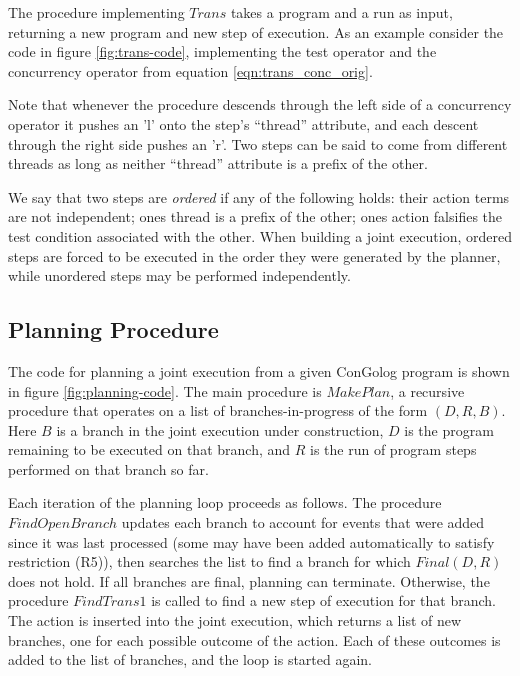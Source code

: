 The procedure implementing $Trans$ takes a program and a run as input,
returning a new program and new step of execution. As an example consider
the code in figure \ref{fig:trans-code}, implementing the test operator
and the concurrency operator from equation \ref{eqn:trans_conc_orig}.


Note that whenever the procedure descends through the left side of
a concurrency operator it pushes an 'l' onto the step's {}``thread''
attribute, and each descent through the right side pushes an 'r'.
Two steps can be said to come from different threads as long as neither
{}``thread'' attribute is a prefix of the other.

We say that two steps are \emph{ordered} if any of the following holds:
their action terms are not independent; ones thread is a prefix of
the other; ones action falsifies the test condition associated with
the other. When building a joint execution, ordered steps are forced
to be executed in the order they were generated by the planner, while
unordered steps may be performed independently.


\subsection{Planning Procedure}

The code for planning a joint execution from a given ConGolog program
is shown in figure \ref{fig:planning-code}. The main procedure is
$MakePlan$, a recursive procedure that operates on a list of branches-in-progress
of the form $(D,R,B)$. Here $B$ is a branch in the joint execution
under construction, $D$ is the program remaining to be executed on
that branch, and $R$ is the run of program steps performed on that
branch so far.


Each iteration of the planning loop proceeds as follows. The procedure
$FindOpenBranch$ updates each branch to account for events that were
added since it was last processed (some may have been added automatically
to satisfy restriction (R5)), then searches the list to find a branch
for which $Final(D,R)$ does not hold. If all branches are final,
planning can terminate. Otherwise, the procedure $FindTrans1$ is
called to find a new step of execution for that branch. The action
is inserted into the joint execution, which returns a list of new
branches, one for each possible outcome of the action. Each of these
outcomes is added to the list of branches, and the loop is started
again.

